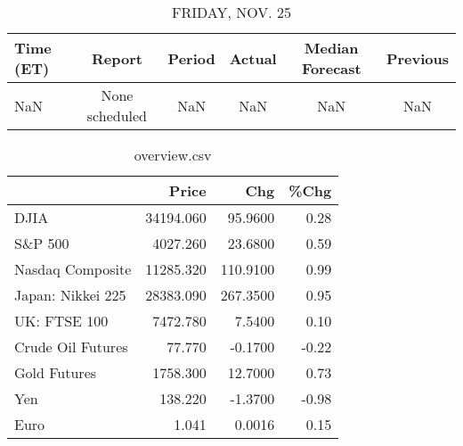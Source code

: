 \documentclass{article}%
\begin{document}
%


\begin{table}[htbp]%
\caption{FRIDAY, NOV. 25}%
\centering%
\begin{adjustbox}{width=1\textwidth}%
\begin{tabular}{lccccc}
\toprule
Time (ET) &         Report & Period & Actual & Median Forecast & Previous \\
\midrule
      NaN & None scheduled &    NaN &    NaN &             NaN &      NaN \\
\bottomrule
\end{tabular}
%
\end{adjustbox}%
\end{table}

%


\begin{table}[htbp]%
\caption{overview.csv}%
\centering%
\begin{adjustbox}{width=1\textwidth}%
\begin{tabular}{lrrr}
\toprule
                  &     Price &      Chg &  \%Chg \\
\midrule
             DJIA & 34194.060 &  95.9600 &  0.28 \\
          S\&P 500 &  4027.260 &  23.6800 &  0.59 \\
 Nasdaq Composite & 11285.320 & 110.9100 &  0.99 \\
Japan: Nikkei 225 & 28383.090 & 267.3500 &  0.95 \\
     UK: FTSE 100 &  7472.780 &   7.5400 &  0.10 \\
Crude Oil Futures &    77.770 &  -0.1700 & -0.22 \\
     Gold Futures &  1758.300 &  12.7000 &  0.73 \\
              Yen &   138.220 &  -1.3700 & -0.98 \\
             Euro &     1.041 &   0.0016 &  0.15 \\
\bottomrule
\end{tabular}
%
\end{adjustbox}%
\end{table}

%
\end{document}
